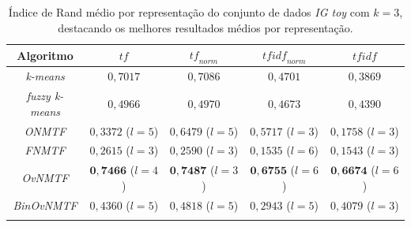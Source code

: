 \documentclass[
    12pt,                %
    oneside,            %
    a4paper,            %
    english,            %
    brazil                %
    ]{abntex2ppgsi}
\begin{document}
\begin{table}[H]
\centering
    \caption{Índice de Rand médio por representação do conjunto de dados \textit{IG toy} com $k = 3$, destacando os melhores resultados médios por representação.}
    \begin{tabular}{ccccc}
        \hline
        Algoritmo              & $\textit{tf}$ & $\textit{tf}_{norm}$ & $\textit{tfidf}_{norm}$ & $\textit{tfidf}$ \\
        \hline
        \textit{k-means}       & $0,7017$                    & $0,7086$           & $0,4701$           & $0,3869$           \\
        \textit{fuzzy k-means} & $0,4966$                    & $0,4970$           & $0,4673$           & $0,4390$           \\
        \textit{ONMTF}         & $0,3372$ ($l = 5$)          & $0,6479$ ($l = 5$) & $0,5717$ ($l = 3$) & $0,1758$ ($l = 3$) \\
        \textit{FNMTF}         & $0,2615$ ($l = 3$)          & $0,2590$ ($l = 3$) & $0,1535$ ($l = 6$) & $0,1543$ ($l = 3$) \\
        \textit{OvNMTF}        & $\mathbf{0,7466}$ ($l = 4$) & $\mathbf{0,7487}$ ($l = 3$) & $\mathbf{0,6755}$ ($l = 6$) & $\mathbf{0,6674}$ ($l = 6$) \\
        \textit{BinOvNMTF}     & $0,4360$ ($l = 5$)          & $0,4818$ ($l = 5$) & $0,2943$ ($l = 5$) & $0,4079$ ($l = 3$) \\
        \hline \\
    \end{tabular}
    \label{tab:experiments-quant-rand:igtoy}
\end{table}
\end{document}
